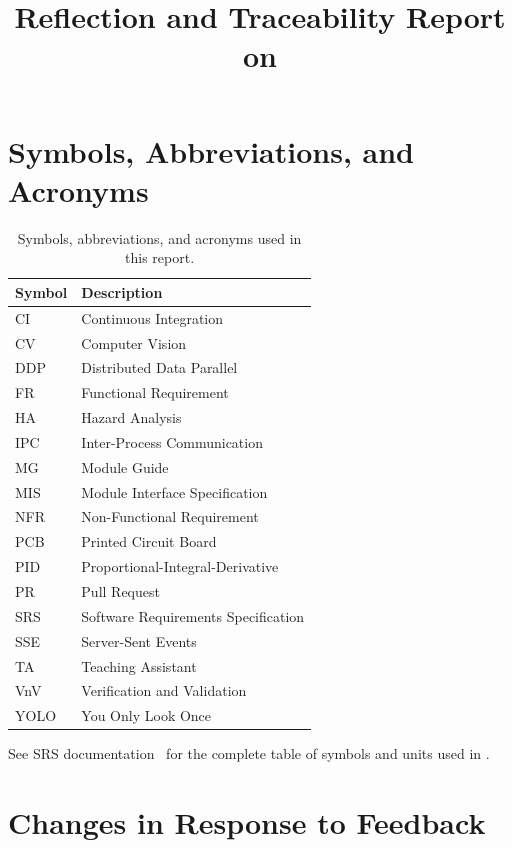 \documentclass{article}
\title{Reflection and Traceability Report on \progname}
\author{\authname}
\date{}
\begin{document}
\maketitle

\newpage
\newpage

\section{Symbols, Abbreviations, and Acronyms}

\begin{table}[H]
  \centering
  \begin{tabular}{|l|l|}
    \hline
    \textbf{Symbol} & \textbf{Description} \\
    \hline
    CI   & Continuous Integration \\
    CV   & Computer Vision \\
    DDP  & Distributed Data Parallel \\
    FR   & Functional Requirement \\
    HA   & Hazard Analysis \\
    IPC  & Inter-Process Communication \\
    MG   & Module Guide \\
    MIS  & Module Interface Specification \\
    NFR  & Non-Functional Requirement \\
    PCB  & Printed Circuit Board \\
    PID  & Proportional-Integral-Derivative \\
    PR   & Pull Request \\
    SRS  & Software Requirements Specification \\
    SSE  & Server-Sent Events \\
    TA   & Teaching Assistant \\
    VnV  & Verification and Validation \\
    YOLO & You Only Look Once \\
    \hline
  \end{tabular}
  \caption{Symbols, abbreviations, and acronyms used in this report.}
  \label{tab:symbols-acronyms}
\end{table}

See SRS documentation~\cite{SRS} for the complete table of symbols and units
used in \progname.

\newpage
\tableofcontents
\listoftables
\listoffigures
\newpage

\section{Changes in Response to Feedback}
\end{document}
